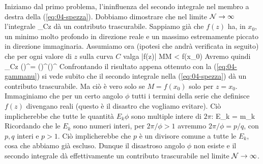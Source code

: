 Iniziamo dal primo problema, l'ininfluenza del secondo integrale nel membro a destra della (\ref{eq:04-spezza}). Dobbiamo dimostrare che nel limite ${\mathcal N}\to\infty$ l'integrale
\be
{}\int_C\de z
\ee
dà un contributo trascurabile. Sappiamo già che $f(z)$ ha, in $x_0$, un minimo molto profondo in direzione reale e un massimo estremamente piccato in direzione immaginaria. Assumiamo ora (ipotesi che andrà verificata in seguito) che per ogni valore di $z$ sulla curva $C$ valga
\be
|f(z)| \le M\quad M < f(x_0)
\ee
Avremo quindi
\be
{}\int_C\de z \le 
{} \oint\de\theta \simeq 
\left(\right)^\calN = \left(\right)^\calN\left(\right)^\calN
\ee
Confrontando il risultato appena ottenuto con la (\ref{eq:04-gammanu}) si vede subito che il secondo integrale nella (\ref{eq:04-spezza}) dà un contributo trascurabile. Ma ciò è vero solo se $M = f(x_0)$ solo per $z = x_0$. Immaginiamo che per un certo angolo $\phi$ tutti i termini della serie che definisce $f(z)$ divengano reali (questo è il disastro che vogliamo evitare). Ciò implicherebbe che tutte le quantità $E_k\phi$ sono multiple intere di $2\pi$:
\be
E_k = m_k\frac{2\pi}{\phi}
\ee
Ricordando che le $E_k$ sono numeri interi, per $2\pi/\phi > 1$ avremmo $2\pi/\phi = p/q$, con $p, q$ interi e $p > 1$. Ciò implicherebbe che $p$ è un divisore comune a tutte le $E_k$, cosa che abbiamo già escluso. Dunque il disastroso angolo $\phi$ non esiste e il secondo integrale dà effettivamente un contributo trascurabile nel limite ${\mathcal N}\to\infty$.

